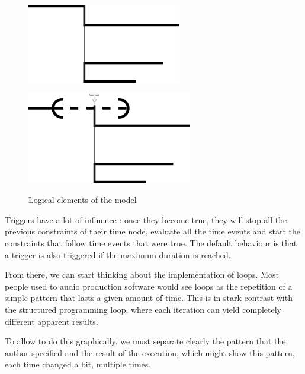 \documentclass{sigchi}
\begin{document}
\begin{figure}
	\centering
	\begin{minipage}[b]{.5\linewidth}
		\centering
		\includegraphics[scale=0.5]{images/events.png}
		\label{fig.logical.events}
	\end{minipage}\begin{minipage}[b]{.5\linewidth}
	\centering
	\includegraphics[scale=0.5]{images/trigger.png}
	\label{fig.logical.trigger}
    \end{minipage}	

\caption{Logical elements of the model}
\label{fig.logical}
\end{figure}	

Triggers have a lot of influence : once they become true, they will stop all the previous constraints of their time node, evaluate all the time events and start the constraints that follow time events that were true. The default behaviour is that a trigger is also triggered if the maximum duration is reached.

From there, we can start thinking about the implementation of loops. Most people used to audio production software would see loops as the repetition of a simple pattern that lasts a given amount of time. This is in stark contrast with the structured programming loop, where each iteration can yield completely different apparent results.

To allow to do this graphically, we must separate clearly the pattern that the author specified and the result of the execution, which might show this pattern, each time changed a bit, multiple times.
\end{document}
